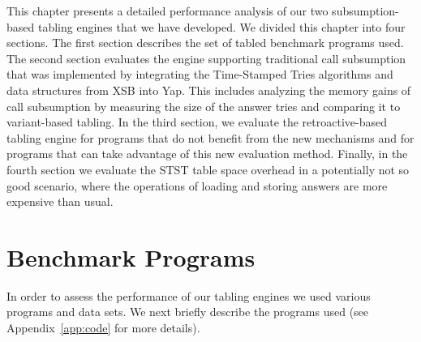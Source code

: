 This chapter presents a detailed performance analysis of our two subsumption-based tabling engines
that we have developed. We divided this chapter into four sections. The first section describes the
set of tabled benchmark programs used. The second
section evaluates the engine supporting traditional call subsumption that was implemented by integrating the
Time-Stamped Tries algorithms and data structures from XSB into Yap. This includes analyzing the memory gains
of call subsumption by measuring the size of the answer tries and comparing it to variant-based tabling.
In the third section, we evaluate the retroactive-based tabling engine for programs that do not benefit
from the new mechanisms and for programs that can take advantage of this new evaluation method. Finally,
in the fourth section we evaluate the STST table space overhead in a potentially not so good scenario,
where the operations of loading and storing answers are more expensive than usual.

\section{Benchmark Programs}

In order to assess the performance of our tabling engines we used various programs and data sets.
We next briefly describe the programs used (see Appendix~\ref{app:code} for more details).

